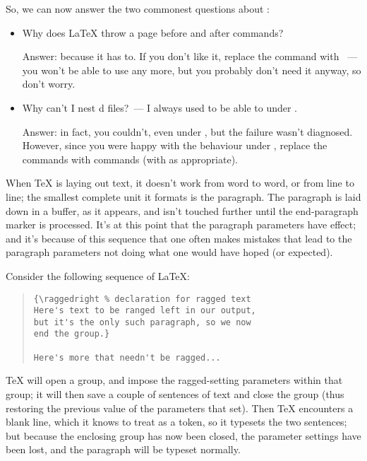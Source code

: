 So, we can now answer the two commonest questions about :
\begin{itemize}
\item Why does \LaTeX{} throw a page before and after 
  commands?

  Answer: because it has to.  If you don't like it, replace the
   command with ~--- you won't be able to use
   any more, but you probably don't need it anyway, so
  don't worry.
\begin{htmlversion}

\end{htmlversion}
\item Why can't I nest d files?~--- I always used to be
  able to under \LaTeXo{}.

  Answer: in fact, you couldn't, even under \LaTeXo{}, but the failure
  wasn't diagnosed.  However, since you were happy with the behaviour
  under \LaTeXo{}, replace the  commands with 
  commands (with  as appropriate).
\end{itemize}



When \TeX{} is laying out text, it doesn't work from word to word, or
from line to line; the smallest complete unit it formats is the
paragraph.  The paragraph is laid down in a buffer, as it appears, and
isn't touched further until the end-paragraph marker is processed.
It's at this point that the paragraph parameters have effect; and it's
because of this sequence that one often makes mistakes that lead to
the paragraph parameters not doing what one would have hoped (or
expected).

Consider the following sequence of \LaTeX{}:
\begin{quote}
\begin{verbatim}
{\raggedright % declaration for ragged text
Here's text to be ranged left in our output,
but it's the only such paragraph, so we now
end the group.}

Here's more that needn't be ragged...
\end{verbatim}
\end{quote}
\TeX{} will open a group, and impose the ragged-setting parameters within
that group; it will then save a couple of sentences of text and
close the group (thus restoring the previous value of the
parameters that  set).  Then \TeX{} encounters a blank
line, which it knows to treat as a  token, so it typesets the
two sentences; but because the enclosing group has now been closed,
the parameter settings have been lost, and the paragraph will be
typeset normally.

